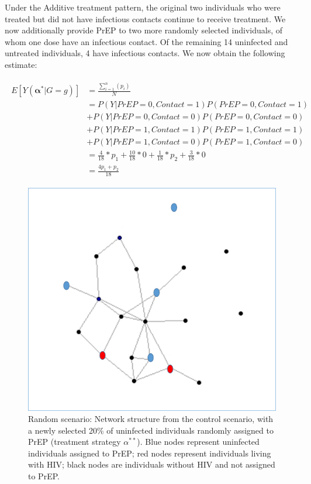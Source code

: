 \documentclass{article}
\theoremstyle{definition}
\begin{document}
Under the Additive treatment pattern, the original two individuals who were treated but did not have infectious contacts continue to receive treatment. We now additionally provide PrEP to two more randomly selected individuals, of whom one dose have an infectious contact. Of the remaining 14 uninfected and untreated individuals, 4 have infectious contacts. We now obtain the following estimate: 

\begin{align}
\begin{split}
E[Y\left(\mathbf{\alpha^*}|G=g\right)] & = \frac{\sum_{i=1}^{n}(p_{i})}{N}  \\ 
& = P\left(Y|PrEP = 0, Contact = 1\right)P\left(PrEP = 0, Contact = 1\right)  \\ \nonumber
& +P\left(Y|PrEP = 0, Contact = 0\right)P\left(PrEP = 0, Contact = 0\right)  \\ \nonumber
& +P\left(Y|PrEP = 1, Contact = 1\right)P\left(PrEP = 1, Contact = 1\right) \\ \nonumber
&  +P\left(Y|PrEP = 1, Contact = 0\right)P\left(PrEP = 1, Contact = 0\right) \\ \nonumber
 &= \frac{4}{18}*p_1 +  \frac{10}{18}*0 +\frac{1}{18}*p_2 +  \frac{3}{18}*0\\ \nonumber
 &=\frac{4p_1+p_2}{18}  \nonumber
 \end{split}
\end{align}

\begin{figure}[H]
    \centering
    \includegraphics[scale=0.5]{Original Figures/Network Example 3.png}
    \caption{Random scenario: Network structure from the control scenario, with a newly selected 20\%  of uninfected individuals randomly assigned to PrEP  (treatment strategy $\alpha^{**}$). Blue nodes represent uninfected individuals assigned to PrEP; red nodes represent individuals living with HIV; black nodes are individuals without HIV and not assigned to PrEP.}
    \label{fig:Figure 6}
\end{figure}
\end{document}
